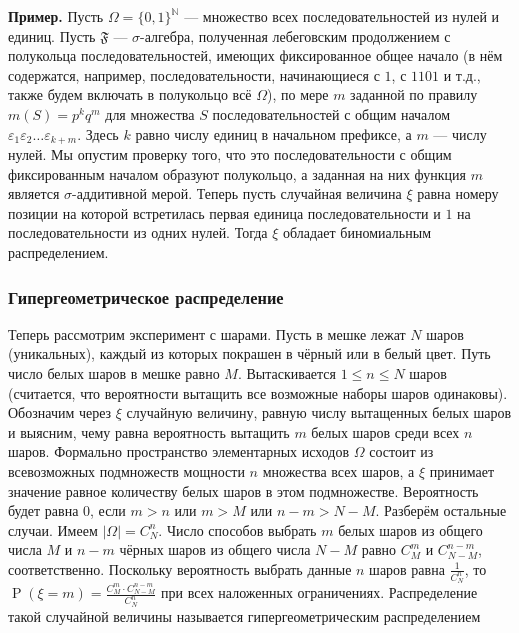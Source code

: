 \documentclass[12pt]{article}
\numberwithin{theorem}{section}
\theoremstyle{definition}
\newenvironment{example}{\indent \textbf{Пример.}}{\indent}
\newcommand{\defin}[2]{\hypertarget{#2}{{\color{red} #1}}}
\newcommand{\prob}{\operatorname{P}}
\newcommand{\events}{\mathfrak{F}}
\begin{document}
	\begin{example}
		Пусть $ \Omega = \{0,1\}^{\mathbb{N}} $ --- множество всех последовательностей из нулей и единиц.
		Пусть $ \events $ --- $ \sigma $-алгебра, полученная лебеговским продолжением с полукольца последовательностей,
		имеющих фиксированное общее начало 
		(в нём содержатся, например, последовательности, начинающиеся с $ 1 $, с $ 1101 $ и т.д., 
		также будем включать в полукольцо всё $ \Omega $), 
		по мере $ m $ заданной по правилу $ m(S) = p^kq^m $ для множества $ S $ последовательностей с общим началом
		$ \varepsilon_1\varepsilon_2\ldots\varepsilon_{k + m} $. Здесь $ k $ равно числу единиц в начальном префиксе, 
		а $ m $ --- числу нулей. 
		Мы опустим проверку того, что это последовательности с общим фиксированным началом образуют полукольцо,
		а заданная на них функция $ m $ является $ \sigma $-аддитивной мерой.
		Теперь пусть случайная величина $ \xi $ равна номеру позиции на которой встретилась первая единица последовательности
		и $ 1 $ на последовательности из одних нулей.
		Тогда $ \xi $ обладает биномиальным распределением.
	\end{example}
	
	\subsubsection{Гипергеометрическое распределение}
	
	Теперь рассмотрим эксперимент с шарами. Пусть в мешке лежат $ N $ шаров (уникальных), 
	каждый из которых покрашен в чёрный или в белый цвет.
	Путь число белых шаров в мешке равно $ M $. Вытаскивается $ 1 \leqslant n \leqslant N $ шаров
	(считается, что вероятности вытащить все возможные наборы шаров одинаковы).
	Обозначим через $ \xi $ случайную величину, равную числу вытащенных белых шаров и выясним, чему равна вероятность
	вытащить $ m $ белых шаров среди всех $ n $ шаров.
	Формально пространство элементарных исходов $ \Omega $ состоит из всевозможных подмножеств мощности $ n $
	множества всех шаров, а $ \xi $ принимает значение равное количеству белых шаров в этом подмножестве.
	Вероятность будет равна $ 0 $, если $ m > n $ или $ m > M $ или $ n - m > N - M $. Разберём остальные случаи.
	Имеем $ |\Omega| = C_N^n $. Число способов выбрать $ m $ белых шаров из общего числа $ M $
	и $ n - m $ чёрных шаров из общего числа $ N - M $ равно $ C_M^m $ и $ C_{N - M}^{n - m} $, соответственно.
	Поскольку вероятность выбрать данные $ n $ шаров равна $ \tfrac{1}{C_N^n} $,
	то $ \prob(\xi = m) = \tfrac{C_M^m \cdot C_{N - M}^{n - m}}{C_N^n} $ при всех наложенных ограничениях.
	Распределение такой случайной величины называется \defin{гипергеометрическим распределением}{hypergeometric-distribution}
	
\end{document}
